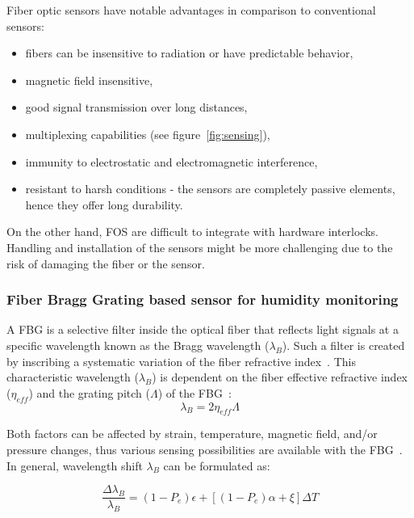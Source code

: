 Fiber optic sensors have notable advantages in comparison to conventional sensors:

\begin{itemize}
    \item fibers can be insensitive to radiation or have predictable behavior,
    \item magnetic field insensitive,
    \item good signal transmission over long distances,
    \item multiplexing capabilities (see figure~\ref{fig:sensing}),
    \item immunity to electrostatic and electromagnetic interference,
    \item resistant to harsh conditions - the sensors are completely passive elements, hence they offer long durability.
\end{itemize}

On the other hand, \gls{FOS} are difficult to integrate with hardware interlocks. Handling and installation of the sensors might be more challenging due to the risk of damaging the fiber or the sensor. 




\subsubsection{Fiber Bragg Grating based sensor for humidity monitoring }
\label{fbg}
A FBG is a selective filter inside the optical fiber that reflects light signals at a specific wavelength known as the Bragg wavelength ($\lambda_{B}$). Such a filter is created by inscribing a systematic variation of the fiber refractive index~\cite{fbg_overview}. This characteristic wavelength ($\lambda_{B}$) is dependent on the fiber effective refractive index ($\eta_{eff}$) and the grating pitch ($\Lambda$) of the \gls{FBG}~\cite{Othonos2000FiberBG}:
\begin{equation}
    \lambda_{B} = 2 \eta_{eff} \Lambda
\end{equation}

Both factors can be affected by strain, temperature, magnetic field, and/or pressure changes, thus various sensing possibilities are available with the FBG~\cite{Yun-Jiang_Rao_1997}. In general, wavelength shift $\lambda_{B}$ can be formulated as:

\begin{equation}
    \frac{\Delta\lambda_{B}}{\lambda_{B}}=(1-P_{e}) \epsilon + \left [(1-P_{e}) \alpha + \xi  \right ] \Delta T
\end{equation}

